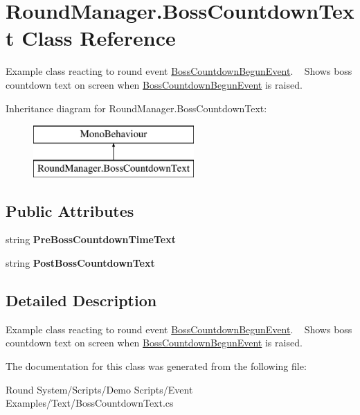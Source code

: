 \hypertarget{class_round_manager_1_1_boss_countdown_text}{}\section{Round\+Manager.\+Boss\+Countdown\+Text Class Reference}
\label{class_round_manager_1_1_boss_countdown_text}


Example class reacting to round event \hyperlink{class_round_manager_1_1_events_1_1_boss_countdown_begun_event}{Boss\+Countdown\+Begun\+Event}. ~\newline
Shows boss countdown text on screen when \hyperlink{class_round_manager_1_1_events_1_1_boss_countdown_begun_event}{Boss\+Countdown\+Begun\+Event} is raised.  


Inheritance diagram for Round\+Manager.\+Boss\+Countdown\+Text\+:\begin{figure}[H]
\begin{center}
\leavevmode
\includegraphics[height=2.000000cm]{class_round_manager_1_1_boss_countdown_text}
\end{center}
\end{figure}
\subsection*{Public Attributes}
\begin{DoxyCompactItemize}
\item 
\hypertarget{class_round_manager_1_1_boss_countdown_text_af18f1358304ded98a12aeba406124a1c}{}string {\bfseries Pre\+Boss\+Countdown\+Time\+Text}\label{class_round_manager_1_1_boss_countdown_text_af18f1358304ded98a12aeba406124a1c}

\item 
\hypertarget{class_round_manager_1_1_boss_countdown_text_a24188e52e23227278f2a0fe97e38f90d}{}string {\bfseries Post\+Boss\+Countdown\+Text}\label{class_round_manager_1_1_boss_countdown_text_a24188e52e23227278f2a0fe97e38f90d}

\end{DoxyCompactItemize}


\subsection{Detailed Description}
Example class reacting to round event \hyperlink{class_round_manager_1_1_events_1_1_boss_countdown_begun_event}{Boss\+Countdown\+Begun\+Event}. ~\newline
Shows boss countdown text on screen when \hyperlink{class_round_manager_1_1_events_1_1_boss_countdown_begun_event}{Boss\+Countdown\+Begun\+Event} is raised. 



The documentation for this class was generated from the following file\+:\begin{DoxyCompactItemize}
\item 
Round System/\+Scripts/\+Demo Scripts/\+Event Examples/\+Text/Boss\+Countdown\+Text.\+cs\end{DoxyCompactItemize}
